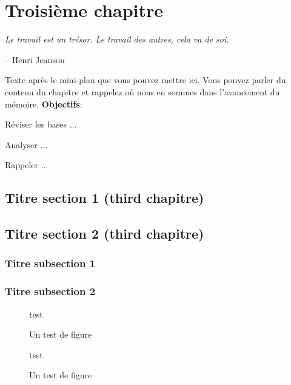 \chapter{Troisième chapitre}
\label{chap:three}

\epigraph{\itshape Le travail est un trésor. Le travail des autres, cela va de soi.}{-- Henri Jeanson}

\stopcontents[chapters]
\startcontents[chapters]

\printMyMinitoc

Texte après le mini-plan que vous pouvez mettre ici. Vous pouvez parler du contenu du chapitre et rappelez où nous en sommes dans l'avancement du mémoire.\newline
{\noindent \color{colorEPISEN-MEMOIRE}\textbf{Objectifs}}:
\begin{itemizeEPISEN}
	\item Réviser les bases ...
	\item Analyser ... 
	\item Rappeler ...
\end{itemizeEPISEN}

\fancyhead[LE]{\textsc{\chaptername~\thechapter}}


\section{Titre section 1 (third chapitre)}
\label{sec:three:one}

\lipsum[4] 

\lipsum[5] 

\section{Titre section 2 (third chapitre)}
\label{sec:three:two}

\lipsum[6]

\subsection{Titre subsection 1}

\lipsum[7]

\lipsum[8]

\lipsum[13]

\subsection{Titre subsection 2}

\lipsum[9]

\lipsum[10]

\lipsum[12]

\begin{figure}[!t]
test
\caption{Un test de figure}
\label{fig:test44}
\end{figure}

\begin{figure}[!t]
test
\caption{Un test de figure}
\label{fig:test55}
\end{figure}
